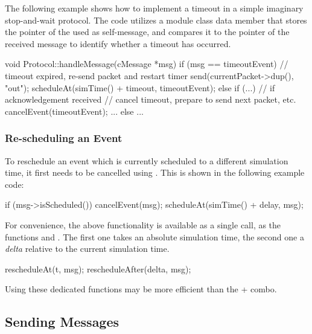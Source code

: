 The following example shows how to implement a timeout in a simple
imaginary stop-and-wait protocol. The code utilizes a 
module class data member that stores the pointer of the  used
as self-message, and compares it to the pointer of the received message
to identify whether a timeout has occurred.

\begin{cpp}
void Protocol::handleMessage(cMessage *msg)
{
    if (msg == timeoutEvent) {
        // timeout expired, re-send packet and restart timer
        send(currentPacket->dup(), "out");
        scheduleAt(simTime() + timeout, timeoutEvent);
    }
    else if (...) {  // if acknowledgement received
        // cancel timeout, prepare to send next packet, etc.
        cancelEvent(timeoutEvent);
        ...
    }
    else {
       ...
    }
}
\end{cpp}


\subsubsection{Re-scheduling an Event}
\label{sec:simple-modules:rescheduling}

To reschedule an event which is currently scheduled to a different
simulation time, it first needs to be cancelled using .
This is shown in the following example code:

\begin{cpp}
if (msg->isScheduled())
    cancelEvent(msg);
scheduleAt(simTime() + delay, msg);
\end{cpp}

For convenience, the above functionality is available as a single
call, as the functions  and .
The first one takes an absolute simulation time, the second one a
\textit{delta} relative to the current simulation time.

\begin{cpp}
rescheduleAt(t, msg);
rescheduleAfter(delta, msg);
\end{cpp}

Using these dedicated functions may be more efficient than the
+ combo.


\subsection{Sending Messages}
\label{sec:simple-modules:sending-messages}

